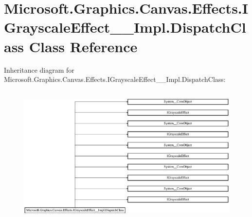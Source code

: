 \hypertarget{class_microsoft_1_1_graphics_1_1_canvas_1_1_effects_1_1_i_grayscale_effect_____impl_1_1_dispatch_class}{}\section{Microsoft.\+Graphics.\+Canvas.\+Effects.\+I\+Grayscale\+Effect\+\_\+\+\_\+\+Impl.\+Dispatch\+Class Class Reference}
\label{class_microsoft_1_1_graphics_1_1_canvas_1_1_effects_1_1_i_grayscale_effect_____impl_1_1_dispatch_class}
Inheritance diagram for Microsoft.\+Graphics.\+Canvas.\+Effects.\+I\+Grayscale\+Effect\+\_\+\+\_\+\+Impl.\+Dispatch\+Class\+:\begin{figure}[H]
\begin{center}
\leavevmode
\includegraphics[height=7.064220cm]{class_microsoft_1_1_graphics_1_1_canvas_1_1_effects_1_1_i_grayscale_effect_____impl_1_1_dispatch_class}
\end{center}
\end{figure}
